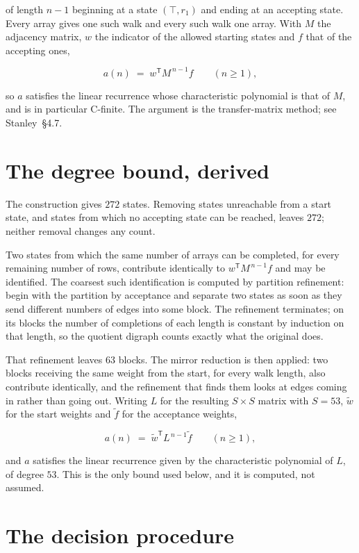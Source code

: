 \documentclass[11pt]{article}
\theoremstyle{definition}
\begin{document}
of length $n-1$ beginning at a state $(\top,r_1)$ and ending at an accepting state. Every array gives one such walk and every such walk one array. With $M$ the adjacency matrix, $w$ the indicator of the allowed starting states and $f$ that of the accepting ones,

\[a(n) \;=\; w^{\mathsf T} M^{\,n-1} f \qquad (n \ge 1),\]

so $a$ satisfies the linear recurrence whose characteristic polynomial is that of $M$, and is in particular C-finite. The argument is the transfer-matrix method; see Stanley~\S4.7.

\section{The degree bound, derived}

The construction gives $272$ states. Removing states unreachable from a start state, and states from which no accepting state can be reached, leaves $272$; neither removal changes any count.

Two states from which the same number of arrays can be completed, for every remaining number of rows, contribute identically to $w^{\mathsf T}M^{\,n-1}f$ and may be identified. The coarsest such identification is computed by partition refinement: begin with the partition by acceptance and separate two states as soon as they send different numbers of edges into some block. The refinement terminates; on its blocks the number of completions of each length is constant by induction on that length, so the quotient digraph counts exactly what the original does.

That refinement leaves $63$ blocks. The mirror reduction is then applied: two blocks receiving the same weight from the start, for every walk length, also contribute identically, and the refinement that finds them looks at edges coming in rather than going out. Writing $L$ for the resulting $S \times S$ matrix with $S = 53$, $\tilde w$ for the start weights and $\tilde f$ for the acceptance weights,

\[a(n) \;=\; \tilde w^{\mathsf T} L^{\,n-1} \tilde f \qquad (n \ge 1),\]

and $a$ satisfies the linear recurrence given by the characteristic polynomial of $L$, of degree $53$. This is the only bound used below, and it is computed, not assumed.

\section{The decision procedure}
\end{document}
